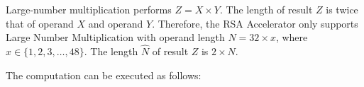 \documentclass[main\_\_EN.tex]{subfiles}
\begin{document}
Large-number multiplication performs \begin{math}Z = X \times Y\end{math}. The length of result \begin{math}Z\end{math} is twice that of operand \begin{math}X\end{math} and operand \begin{math}Y\end{math}. Therefore, the RSA Accelerator only supports Large Number Multiplication with operand length \begin{math}N = 32 \times x\end{math}, where \begin{math}x \in \{ 1, 2, 3, \dots, 48\}\end{math}. The length \begin{math}\hat{N}\end{math} of result \begin{math}Z\end{math} is \begin{math}2 \times N\end{math}.

The computation can be executed as follows:
\end{document}
